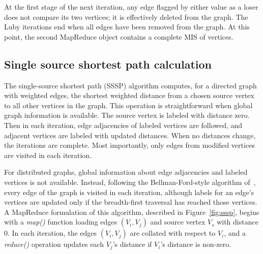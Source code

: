 At the first stage of the next iteration, any edge flagged by either
value as a loser does not compare its two vertices; it is effectively
deleted from the graph.  The Luby iterations end when all edges have
been removed from the graph.  At this point, the second MapReduce
object contains a complete MIS of vertices.

\subsection{Single source shortest path calculation}

The single-source shortest path (SSSP) algorithm computes, for a
directed graph with weighted edges, the shortest weighted distance
from a chosen source vertex to all other vertices in the graph.  This
operation is straightforward when global graph information is
available.  The source vertex is labeled with distance zero.  Then in
each iteration, edge adjacencies of labeled vertices are followed, and
adjacent vertices are labeled with updated distances.  When no
distances change, the iterations are complete.  Most importantly, only
edges from modified vertices are visited in each iteration.

For distributed graphs, global information about edge adjacencies and
labeled vertices is not available.  Instead, following the
Bellman-Ford-style algorithm of~\cite{SSSPMapReduce, Bellman58,
Ford62}, every edge of the graph is visited in each iteration,
although labels for an edge's vertices are updated only if the
breadth-first traversal has reached those vertices.  A MapReduce
formulation of this algorithm, described in Figure~\ref{fig:sssp},
begins with a {\it map()} function loading edges $(V_i, V_j)$ and
source vertex $V_s$ with distance 0.  In each iteration, the edges
$(V_i, V_j)$ are collated with respect to $V_i$, and a {\it reduce()}
operation updates each $V_j$'s distance if $V_i$'s distance is
non-zero.


